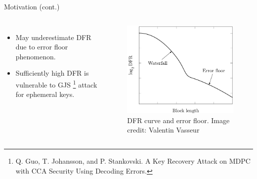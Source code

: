 \begin{frame}{Motivation (cont.)}
\begin{columns}
\begin{itemize}
    \item May underestimate DFR due to error floor phenomenon.
    \item Sufficiently high DFR is vulnerable to GJS \footnote{Q. Guo, T. Johansson, and P. Stankovski. A Key Recovery Attack on MDPC with CCA
Security Using Decoding Errors.} attack for ephemeral keys.
\end{itemize}

    \begin{figure}
    \centering
    \includegraphics[scale=.2]{Images/errorfloor.png}
    \caption{DFR curve and error floor. Image credit: Valentin Vasseur}
    \label{fig:errorfloor}
\end{figure}

\end{columns}    
\end{frame}
